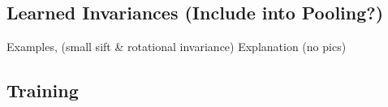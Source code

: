 \documentclass[]{article}
\begin{document}

\subsection{Learned Invariances (Include into Pooling?)}
Examples, (small sift & rotational invariance) Explanation (no pics)

\subsection{Training}



%

%
%


\end{document}
